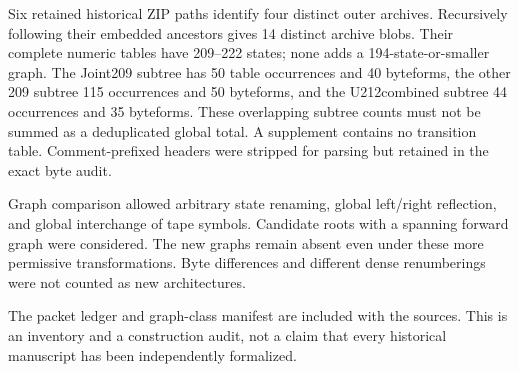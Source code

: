 \documentclass[11pt,a4paper]{article}
\begin{document}
Six retained historical ZIP paths identify four distinct outer archives.
Recursively following their embedded ancestors gives 14 distinct archive
blobs. Their complete numeric tables have 209--222 states; none adds a
194-state-or-smaller graph. The Joint209 subtree has 50 table occurrences
and 40 byteforms, the other 209 subtree 115 occurrences and 50 byteforms,
and the U212combined subtree 44 occurrences and 35 byteforms. These
overlapping subtree counts must not be summed as a deduplicated global
total. A supplement contains no transition table. Comment-prefixed
headers were stripped for parsing but retained in the exact byte audit.

Graph comparison allowed arbitrary state renaming, global left/right
reflection, and global interchange of tape symbols. Candidate roots with
a spanning forward graph were considered. The new graphs remain absent
even under these more permissive transformations. Byte differences and
different dense renumberings were not counted as new architectures.

The packet ledger and graph-class manifest are included with the sources.
This is an inventory and a construction audit, not a claim that every
historical manuscript has been independently formalized.
\end{document}
